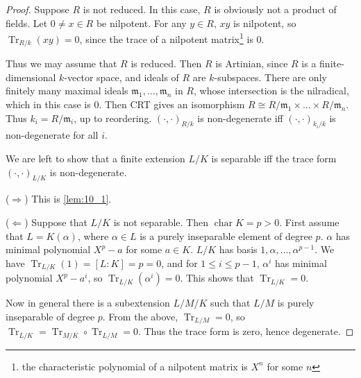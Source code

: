 \documentclass[11pt]{article}
\theoremstyle{definition}
\theoremstyle{plain}
\theoremstyle{remark}
\DeclareMathOperator{\Char}{char}
\DeclareMathOperator{\Tr}{Tr}
\newcommand{\fm}{\mathfrak{m}}
\begin{document}
\begin{proof}
    Suppose $R$ is not reduced. In this case, $R$ is obviously not a product of fields. Let $0 \neq x \in R$ be nilpotent. For any $y \in R$, $xy$ is nilpotent, so $\Tr_{R/k}(xy) = 0$, since the trace of a nilpotent matrix\footnote{the characteristic polynomial of a nilpotent matrix is $X^n$ for some $n$} is $0$.

    Thus we may assume that $R$ is reduced. Then $R$ is Artinian, since $R$ is a finite-dimensional $k$-vector space, and ideals of $R$ are $k$-subspaces. There are only finitely many maximal ideals $\fm_1, \ldots, \fm_n$ in $R$, whose intersection is the nilradical, which in this case is $0$. Then CRT gives an isomorphism $R \cong R/\fm_1 \times \ldots \times R/\fm_n$. Thus $k_i = R / \fm_i$, up to reordering. $(\cdot, \cdot)_{R/k}$ is non-degenerate iff $(\cdot, \cdot)_{k_i/k}$ is non-degenerate for all $i$.

    We are left to show that a finite extension $L/K$ is separable iff the trace form $(\cdot, \cdot)_{L/K}$ is non-degenerate.

    \noindent ($\Rightarrow$) This is \autoref{lem:10_1}.

    \noindent ($\Leftarrow$) Suppose that $L/K$ is not separable. Then $\Char K = p > 0$. First assume that $L = K(\alpha)$, where $\alpha \in L$ is a purely inseparable element of degree $p$. $\alpha$ has minimal polynomial $X^p - a$ for some $a \in K$. $L / K$ has basis $1, \alpha, \ldots, \alpha^{p-1}$. We have $\Tr_{L/K}(1) = [L : K] = p = 0$, and for $1 \le i \le p-1$, $\alpha^i$ has minimal polynomial $X^p - a^i$, so $\Tr_{L/K}(\alpha^i) = 0$. This shows that $\Tr_{L/K} = 0$.

    Now in general there is a subextension $L/M/K$ such that $L/M$ is purely inseparable of degree $p$. From the above, $\Tr_{L/M} = 0$, so $\Tr_{L/K} = \Tr_{M/K} \circ \Tr_{L/M} = 0$. Thus the trace form is zero, hence degenerate.
\end{proof}
\end{document}
